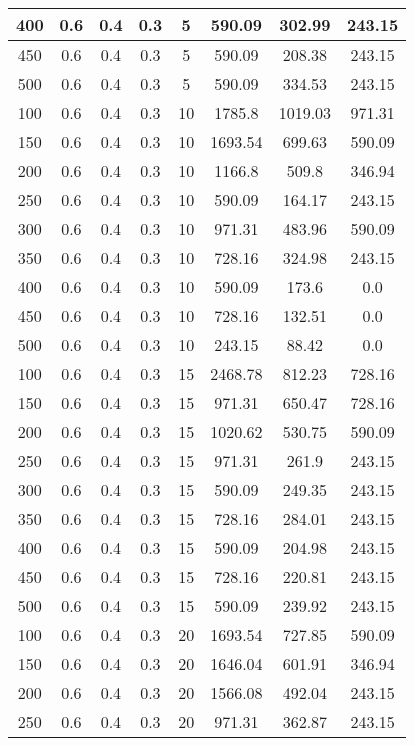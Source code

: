 \documentclass[a4paper, 12pt]{extreport}
\begin{document}
\begin{itemize}
\begin{longtable}{|c|c|c|c|c|c|c|c|}
			400 & 0.6 & 0.4 & 0.3 & 5 & 590.09 & 302.99 & 243.15 \\\hline
			450 & 0.6 & 0.4 & 0.3 & 5 & 590.09 & 208.38 & 243.15 \\\hline
			500 & 0.6 & 0.4 & 0.3 & 5 & 590.09 & 334.53 & 243.15 \\\hline
			100 & 0.6 & 0.4 & 0.3 & 10 & 1785.8 & 1019.03 & 971.31 \\\hline
			150 & 0.6 & 0.4 & 0.3 & 10 & 1693.54 & 699.63 & 590.09 \\\hline
			200 & 0.6 & 0.4 & 0.3 & 10 & 1166.8 & 509.8 & 346.94 \\\hline
			250 & 0.6 & 0.4 & 0.3 & 10 & 590.09 & 164.17 & 243.15 \\\hline
			300 & 0.6 & 0.4 & 0.3 & 10 & 971.31 & 483.96 & 590.09 \\\hline
			350 & 0.6 & 0.4 & 0.3 & 10 & 728.16 & 324.98 & 243.15 \\\hline
			400 & 0.6 & 0.4 & 0.3 & 10 & 590.09 & 173.6 & 0.0 \\\hline
			450 & 0.6 & 0.4 & 0.3 & 10 & 728.16 & 132.51 & 0.0 \\\hline
			500 & 0.6 & 0.4 & 0.3 & 10 & 243.15 & 88.42 & 0.0 \\\hline
			100 & 0.6 & 0.4 & 0.3 & 15 & 2468.78 & 812.23 & 728.16 \\\hline
			150 & 0.6 & 0.4 & 0.3 & 15 & 971.31 & 650.47 & 728.16 \\\hline
			200 & 0.6 & 0.4 & 0.3 & 15 & 1020.62 & 530.75 & 590.09 \\\hline
			250 & 0.6 & 0.4 & 0.3 & 15 & 971.31 & 261.9 & 243.15 \\\hline
			300 & 0.6 & 0.4 & 0.3 & 15 & 590.09 & 249.35 & 243.15 \\\hline
			350 & 0.6 & 0.4 & 0.3 & 15 & 728.16 & 284.01 & 243.15 \\\hline
			400 & 0.6 & 0.4 & 0.3 & 15 & 590.09 & 204.98 & 243.15 \\\hline
			450 & 0.6 & 0.4 & 0.3 & 15 & 728.16 & 220.81 & 243.15 \\\hline
			500 & 0.6 & 0.4 & 0.3 & 15 & 590.09 & 239.92 & 243.15 \\\hline
			100 & 0.6 & 0.4 & 0.3 & 20 & 1693.54 & 727.85 & 590.09 \\\hline
			150 & 0.6 & 0.4 & 0.3 & 20 & 1646.04 & 601.91 & 346.94 \\\hline
			200 & 0.6 & 0.4 & 0.3 & 20 & 1566.08 & 492.04 & 243.15 \\\hline
			250 & 0.6 & 0.4 & 0.3 & 20 & 971.31 & 362.87 & 243.15 \\\hline

\end{longtable}
\end{itemize}
\end{document}
